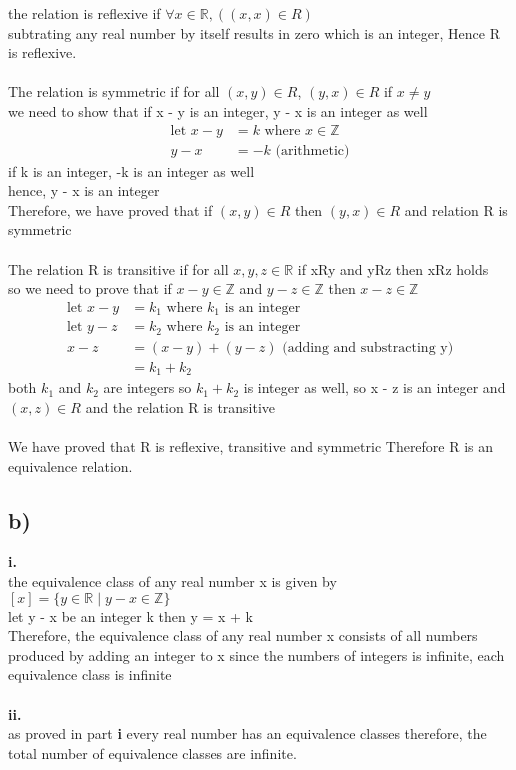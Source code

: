 \documentclass[11pt]{article}
\begin{document}
the relation is reflexive if $\forall x \in \mathbb{R}, ((x,  x) \in R)$ \\
subtrating any real number by itself results in zero which is an integer, Hence
R is reflexive. \\
\\
The relation is symmetric if for all $(x, y) \in R$, $(y, x) \in R$ if $x \neq y$ \\
we need to show that if x - y is an integer, y - x is an integer as well
%
\begin{align*}
    \text{let } x - y &= k \text{ where } x \in \mathbb{Z} \\
    y - x &= -k  \text{ (arithmetic)}
\end{align*}
%
if k is an integer, -k is an integer as well \\
hence, y - x is an integer \\
Therefore, we have proved that if $(x, y) \in R$ then $(y, x) \in R$
and relation R is symmetric \\
\\
The relation R is transitive if for all $x, y, z \in \mathbb{R}$ if xRy and yRz then xRz holds \\
so we need to prove that if $x - y \in \mathbb{Z}$ and $y - z \in \mathbb{Z}$ then $x - z \in \mathbb{Z}$
%
\begin{align*}
    \text{let } x - y &= k_{1} \text{ where $k_{1}$ is an integer} \\
    \text{let } y - z &= k_{2} \text{ where $k_{2}$ is an integer} \\
    x - z &= (x - y) + (y - z) \text{  (adding and substracting y)} \\
    &= k_{1} + k_{2}
\end{align*}
both $k_{1}$ and $k_{2}$ are integers so $k_{1} + k_{2}$ is integer as well,
so x - z is an integer and $(x, z) \in R$ and the relation R is transitive \\
\\
We have proved that R is reflexive, transitive and symmetric Therefore R is
an equivalence relation.

\subsection*{b)}
\textbf{i.} \\
the equivalence class of any real number x is given by \\
$[x] = \{y \in \mathbb{R} \;|\; y - x \in \mathbb{Z}\}$ \\
let y - x be an integer k then y = x + k \\
Therefore, the equivalence class of any real number x consists of all numbers
produced by adding an integer to x
since the numbers of integers is infinite, each equivalence class is infinite
\\ \\
\textbf{ii.} \\
as proved in part \textbf{i} every real number has an equivalence classes therefore,
the total number of equivalence classes are infinite.
\end{document}
